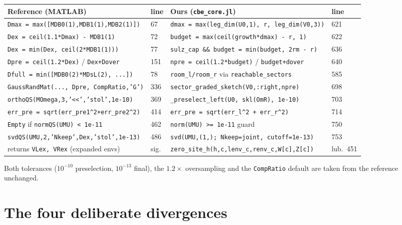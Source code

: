 \documentclass[11pt,a4paper]{article}
\newcommand{\code}[1]{\texttt{\small #1}}
\begin{document}
\small
\begin{longtable}{@{}p{5.9cm}p{1.0cm}p{6.0cm}p{1.0cm}@{}}
\toprule
\textbf{Reference (MATLAB)} & \textbf{line} & \textbf{Ours (\code{cbe\_core.jl})} & \textbf{line} \\
\midrule
\endhead
\code{Dmax = max([MDB0(1),MDB1(1),MDB2(1)])} & 67 &
\code{dmax = max(leg\_dim(U0,1), r, leg\_dim(V0,3))} & 621 \\
\code{Dex = ceil(1.1*Dmax) - MDB1(1)} & 72 &
\code{budget = max(ceil(growth*dmax) - r, 1)} & 622 \\
\code{Dex = min(Dex, ceil(2*MDB1(1)))} & 77 &
\code{sulz\_cap \&\& budget = min(budget, 2rm - r)} & 636 \\
\code{Dpre = ceil(1.2*Dex)} / \code{Dex+Dover} & 151 &
\code{npre = ceil(1.2*budget)} / \code{budget+dover} & 640 \\
\code{Dfull = min([MDB0(2)*MDsL(2), ...])} & 78 &
\code{room\_l/room\_r} via \code{reachable\_sectors} & 585 \\
\code{GaussRandMat(..., Dpre, CompRatio,'G')} & 336 &
\code{sector\_graded\_sketch(V0,:right,npre)} & 698 \\
\code{orthoQS(MOmega,3,'<<','stol',1e-10)} & 369 &
\code{\_preselect\_left(U0, skl(OmR), 1e-10)} & 703 \\
\code{err\_pre = sqrt(err\_pre1\^{}2+err\_pre2\^{}2)} & 414 &
\code{err\_pre = sqrt(err\_l\^{}2 + err\_r\^{}2)} & 714 \\
\code{Empty} if \code{normQS(UMU) < 1e-11} & 462 &
\code{norm(UMU) >= 1e-11} guard & 750 \\
\code{svdQS(UMU,2,'Nkeep',Dex,'stol',1e-13)} & 486 &
\code{svd(UMU,(1,); Nkeep=joint, cutoff=1e-13)} & 753 \\
returns \code{VLex, VRex} (expanded envs) & sig. &
\code{zero\_site\_h(h,c,lenv\_c,renv\_c,W[c],Z[c])} & lub.\ 451 \\
\bottomrule
\end{longtable}
\normalsize

\noindent
Both tolerances ($10^{-10}$ preselection, $10^{-13}$ final), the $1.2\times$ oversampling and
the \code{CompRatio} default are taken from the reference unchanged.

\section{The four deliberate divergences}
\end{document}
